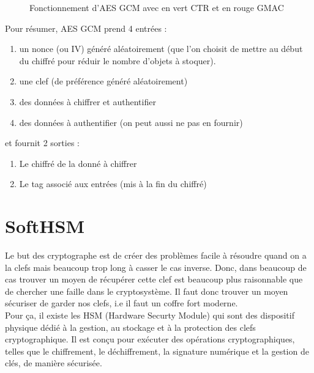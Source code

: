 \documentclass[a4paper, 12pt]{article}
\begin{document}
\begin{figure}[h]
\caption{Fonctionnement d'AES GCM avec en vert CTR et en rouge GMAC}
\label{aesgcm}
\end{figure}


\noindent Pour résumer, AES GCM prend 4 entrées : 
\begin{enumerate}
	\item un nonce (ou IV) généré aléatoirement (que l'on choisit de mettre au début du chiffré pour réduir le nombre d'objets à stoquer).
	\item une clef (de préférence généré aléatoirement)
	\item des données à chiffrer et authentifier 
	\item des données à authentifier (on peut aussi ne pas en fournir)
\end{enumerate}
\noindent et fournit 2 sorties :
\begin{enumerate}
	\item Le chiffré de la donné à chiffrer
\item Le tag associé aux entrées (mis à la fin du chiffré)
\end{enumerate}
\section{SoftHSM}

Le but des cryptographe est de créer des problèmes facile à résoudre quand on a la clefs mais beaucoup trop long à casser le cas inverse. Donc, dans beaucoup de cas trouver un moyen de récupérer cette clef est beaucoup plus raisonnable que de chercher une faille dans le cryptosystème. Il faut donc trouver un moyen sécuriser de garder nos clefs, i.e il faut un coffre fort moderne. \\

Pour ça, il existe les HSM (Hardware Securty Module) qui sont des dispositif physique dédié à la gestion, au stockage et à la protection des clefs cryptographique. Il est conçu pour exécuter des opérations cryptographiques, telles que le chiffrement, le déchiffrement, la signature numérique et la gestion de clés, de manière sécurisée.
\end{document}
